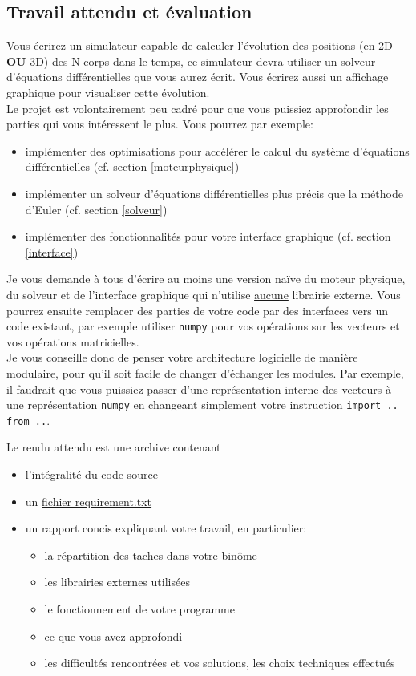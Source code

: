\documentclass{article}
\begin{document}
\subsection{Travail attendu et évaluation}

Vous écrirez un simulateur capable de calculer l'évolution des positions (en 2D \textbf{OU} 3D) des N corps dans le temps, ce simulateur devra utiliser un solveur d'équations différentielles que vous aurez écrit. Vous écrirez aussi un affichage graphique pour visualiser cette évolution. \\
Le projet est volontairement peu cadré pour que vous puissiez approfondir les parties qui vous intéressent le plus. Vous pourrez par exemple:
\begin{itemize}
    \item implémenter des optimisations pour accélérer le calcul du système d'équations différentielles (cf. section \ref{moteurphysique})
    \item implémenter un solveur d'équations différentielles plus précis que la méthode d'Euler (cf. section \ref{solveur})
    \item implémenter des fonctionnalités pour votre interface graphique (cf. section \ref{interface})
\end{itemize}
Je vous demande à tous d'écrire au moins une version naïve du moteur physique, du solveur et de l'interface graphique qui n'utilise \underline{aucune} librairie externe. Vous pourrez ensuite remplacer des parties de votre code par des interfaces vers un code existant, par exemple utiliser \verb!numpy! pour vos opérations sur les vecteurs et vos opérations matricielles.\\
Je vous conseille donc de penser votre architecture logicielle de manière modulaire, pour qu'il soit facile de changer d'échanger les modules. Par exemple, il faudrait que vous puissiez passer d'une représentation interne des vecteurs à une représentation \verb!numpy! en changeant simplement votre instruction \verb!import .. from ..!.

\vspace{1em}

\noindent Le rendu attendu est une archive contenant
\begin{itemize}
    \item l'intégralité du code source
    \item un \href{https://pip.pypa.io/en/stable/user_guide/#requirements-files}{fichier requirement.txt}
    \item un rapport concis expliquant votre travail, en particulier:
    \begin{itemize}
        \item la répartition des taches dans votre binôme
        \item les librairies externes utilisées
        \item le fonctionnement de votre programme
        \item ce que vous avez approfondi
        \item les difficultés rencontrées et vos solutions, les choix techniques effectués
    \end{itemize}
\end{itemize}
\end{document}
